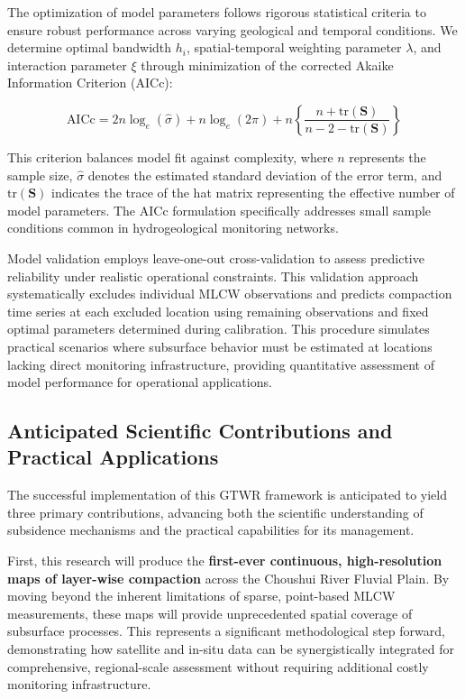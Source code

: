 \documentclass[12pt, a4paper]{article}
\begin{document}
	The optimization of model parameters follows rigorous statistical criteria to ensure robust performance across varying geological and temporal conditions. We determine optimal bandwidth $h_i$, spatial-temporal weighting parameter $\lambda$, and interaction parameter $\xi$ through minimization of the corrected Akaike Information Criterion (AICc):
	
	\begin{equation}
		\text{AICc} = 2n \log_e (\hat{\sigma}) + n \log_e (2\pi) + n \left\{ \frac{n + \text{tr}(\mathbf{S})}{n - 2 - \text{tr}(\mathbf{S})} \right\}
	\end{equation}
	
	This criterion balances model fit against complexity, where $n$ represents the sample size, $\hat{\sigma}$ denotes the estimated standard deviation of the error term, and $\text{tr}(\mathbf{S})$ indicates the trace of the hat matrix representing the effective number of model parameters. The AICc formulation specifically addresses small sample conditions common in hydrogeological monitoring networks.
	
	Model validation employs leave-one-out cross-validation to assess predictive reliability under realistic operational constraints. This validation approach systematically excludes individual MLCW observations and predicts compaction time series at each excluded location using remaining observations and fixed optimal parameters determined during calibration. This procedure simulates practical scenarios where subsurface behavior must be estimated at locations lacking direct monitoring infrastructure, providing quantitative assessment of model performance for operational applications.
		
	\subsection{Anticipated Scientific Contributions and Practical Applications}
	
	The successful implementation of this GTWR framework is anticipated to yield three primary contributions, advancing both the scientific understanding of subsidence mechanisms and the practical capabilities for its management.
	
	First, this research will produce the \textbf{first-ever continuous, high-resolution maps of layer-wise compaction} across the Choushui River Fluvial Plain. By moving beyond the inherent limitations of sparse, point-based MLCW measurements, these maps will provide unprecedented spatial coverage of subsurface processes. This represents a significant methodological step forward, demonstrating how satellite and in-situ data can be synergistically integrated for comprehensive, regional-scale assessment without requiring additional costly monitoring infrastructure.
	
\end{document}
